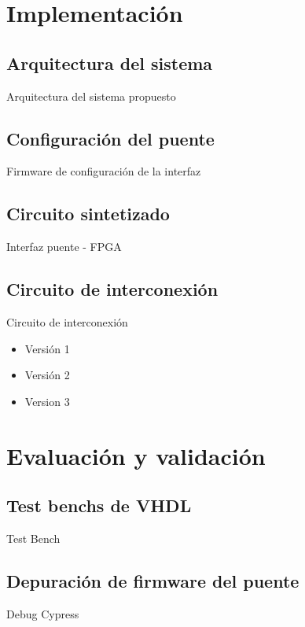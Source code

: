 \documentclass[11pt,a4paper]{beamer}
\begin{document}
	\section{Implementación}
		\subsection{Arquitectura del sistema}
			\begin{frame}{Arquitectura del sistema propuesto}
				
			\end{frame}
		\subsection{Configuración del puente}
			\begin{frame}{Firmware de configuración de la interfaz}
				
			\end{frame}
		\subsection{Circuito sintetizado}
			\begin{frame}{Interfaz puente - FPGA}
				
			\end{frame}
		\subsection{Circuito de interconexión}
			\begin{frame}{Circuito de interconexión}
				\begin{itemize}
					\item Versión 1
					\item Versión 2
					\item Version 3
				\end{itemize}
			\end{frame}
	\section{Evaluación y validación}
		\subsection{Test benchs de VHDL}
			\begin{frame}{Test Bench}
				
			\end{frame}
		\subsection{Depuración de firmware del puente}
			\begin{frame}{Debug Cypress}
				
			\end{frame}
\end{document}
